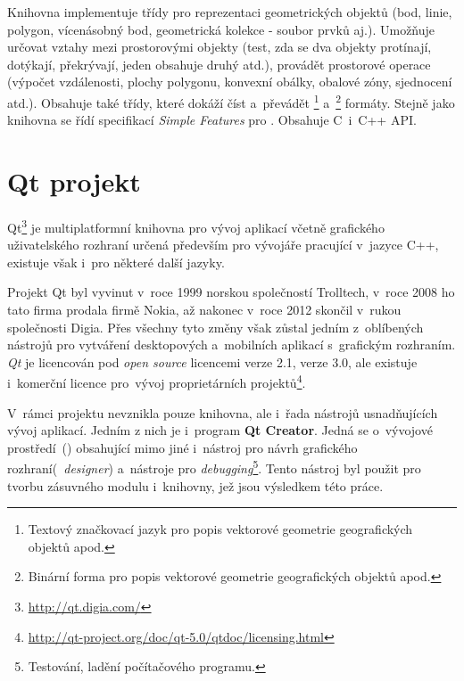 Knihovna  implementuje třídy pro reprezentaci geometrických
objektů (bod, linie, polygon, vícenásobný bod, geometrická kolekce
- soubor prvků aj.). Umožňuje určovat vztahy mezi prostorovými objekty 
(test, zda se dva objekty protínají, dotýkají, překrývají, jeden obsahuje 
druhý atd.), provádět prostorové operace (výpočet vzdálenosti, plochy 
polygonu, konvexní obálky, obalové zóny, sjednocení atd.). Obsahuje také 
třídy, které dokáží číst a~převádět \footnote{Textový 
značkovací jazyk pro popis vektorové geometrie geografických objektů 
apod.} a~\footnote{Binární forma pro popis vektorové 
geometrie geografických objektů apod.} formáty. Stejně jako knihovna 
 se řídí specifikací \textit{Simple Features} pro .
Obsahuje C~i~C++ API.




\section{Qt projekt}
\label{qt}

Qt\footnote{\url{http://qt.digia.com/}} je multiplatformní knihovna pro 
vývoj aplikací včetně grafického uživatelského rozhraní určená především 
pro vývojáře pracující v~jazyce C++, existuje však i~pro některé další 
jazyky.

Projekt Qt byl vyvinut v~roce 1999 norskou společností Trolltech, v~roce 
2008 ho tato firma prodala firmě Nokia, až nakonec v~roce 2012 skončil 
v~rukou společnosti Digia. Přes všechny tyto změny však zůstal jedním 
z~oblíbených nástrojů pro vytváření desktopových a~mobilních aplikací 
s~grafickým rozhraním. \textit{Qt} je licencován pod \textit{open source} 
licencemi  verze 2.1,  verze 3.0, ale existuje i~komerční 
licence pro~vývoj proprietárních 
projektů\footnote{\url{http://qt-project.org/doc/qt-5.0/qtdoc/licensing.html}}.

V~rámci projektu nevznikla pouze knihovna, ale i~řada nástrojů usnadňujících
vývoj aplikací. Jedním z nich je i~program \textbf{Qt Creator}. Jedná se 
o~vývojové prostředí~() obsahující mimo jiné i~nástroj pro návrh 
grafického rozhraní\linebreak[10] (\textit{~designer}) a~nástroje pro 
\textit{debugging}\footnote{Testování, ladění počítačového programu.}.
Tento nástroj byl použit pro tvorbu zásuv\-ného modulu i~knihovny, jež jsou
výsledkem této práce.